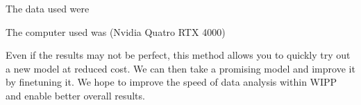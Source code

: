 The data used were \TODO\ \TODO\ \TODO\ \TODO\ \TODO\

The computer used was (Nvidia Quatro RTX 4000)  \TODO\ \TODO\ \TODO\ \TODO\ \TODO\

Even if the results may not be perfect, this method allows you to quickly try
out a new model at reduced cost. We can then take a promising model and improve
it by finetuning it. We hope to improve the speed of data analysis within WIPP
and enable better overall results.
